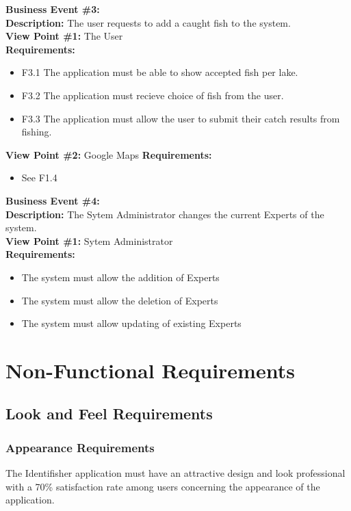 \documentclass{article}
\begin{document}
	\noindent\textbf{Business Event \#3:} \\
	\textbf{Description:} The user requests to add a caught fish to the system. \\
	\textbf{View Point \#1:} The User \\
	\textbf{Requirements:}
	\begin{itemize}
		\item F3.1 The application must be able to show accepted fish per lake.
		\item F3.2 The application must recieve choice of fish from the user.
		\item F3.3 The application must allow the user to submit their catch results from fishing.
	\end{itemize}
	\textbf{View Point \#2:} Google Maps
	\textbf{Requirements:}
	\begin{itemize}
		\item See F1.4
	\end{itemize}

	\noindent\textbf{Business Event \#4:} \\
	\textbf{Description:} The Sytem Administrator changes the current Experts of the system. \\
	\textbf{View Point \#1:} Sytem Administrator \\
	\textbf{Requirements:}
	\begin{itemize}
		\item The system must allow the addition of Experts
		\item The system must allow the deletion of Experts
		\item The system must allow updating of existing Experts
	\end{itemize}



\section{Non-Functional Requirements}

\subsection{Look and Feel Requirements}
\subsubsection{Appearance Requirements}
The Identifisher application must have an attractive design and look professional with a 70\% satisfaction rate among users concerning the appearance of the application.
\end{document}
